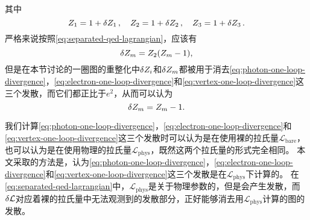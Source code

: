 其中
\begin{equation}
    Z_1 = 1 + \var{Z_1}, \quad Z_2 = 1 + \var{Z_2}, \quad Z_3 = 1 + \var{Z_3}.
\end{equation}
严格来说按照\eqref{eq:separated-qed-lagrangian}，应该有
\begin{equation}
    \var{Z_m} = Z_2 (Z_m - 1),
\end{equation}
但是在本节讨论的一圈图的重整化中$\var{Z_i}$和$\var{Z_m}$都被用于消去\eqref{eq:photon-one-loop-divergence}，\eqref{eq:electron-one-loop-divergence}和\eqref{eq:vertex-one-loop-divergence}这三个发散，而它们都正比于$e^2$，从而可以认为
\begin{equation}
    \var{Z_m} = Z_m - 1.
\end{equation}

我们计算\eqref{eq:photon-one-loop-divergence}，\eqref{eq:electron-one-loop-divergence}和\eqref{eq:vertex-one-loop-divergence}这三个发散时可以认为是在使用裸的拉氏量$\mathcal{L}_\text{bare}$，也可以认为是在使用物理的拉氏量$\mathcal{L}_\text{phys}$，既然这两个拉氏量的形式完全相同。
本文采取的方法是，认为\eqref{eq:photon-one-loop-divergence}，\eqref{eq:electron-one-loop-divergence}和\eqref{eq:vertex-one-loop-divergence}这三个发散是在$\mathcal{L}_\text{phys}$下计算的。
在\eqref{eq:separated-qed-lagrangian}中，$\mathcal{L}_\text{phys}$是关于物理参数的，但是会产生发散，而$\var{\mathcal{L}}$对应着裸的拉氏量中无法观测到的发散部分，正好能够消去用$\mathcal{L}_\text{phys}$计算的图的发散。

